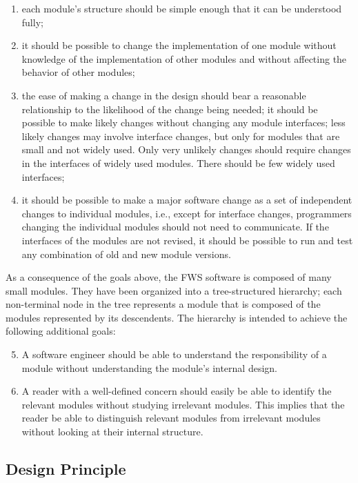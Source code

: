 \documentclass[letterpaper,11pt]{article}
\begin{document}
\begin{enumerate}
\item each module's structure should be simple enough that it can be understood fully;
\item it should be possible to change the implementation of one module without knowledge of the implementation of other modules and without affecting the behavior of other modules;
\item the ease of making a change in the design should bear a reasonable relationship to the likelihood of the change being needed; it should be possible to make likely changes without changing any module interfaces; less likely changes may involve interface changes, but only for modules that are small and not widely used. Only very unlikely changes should require changes in the interfaces of widely used modules. There should be few widely used interfaces;
\item it should be possible to make a major software change as a set of independent changes to individual modules, i.e., except for interface changes, programmers changing the individual modules should not need to communicate. If the interfaces of the modules are not revised, it should be possible to run and test any combination of old and new module versions.
\end{enumerate}

As a consequence of the goals above, the FWS software is composed of many small modules. They have been organized into a tree-structured hierarchy; each non-terminal node in the tree represents a module that is composed of the modules represented by its descendents. The hierarchy is intended to achieve the following additional goals:

\begin{enumerate}
\setcounter{enumi}{4}
\item A software engineer should be able to understand the responsibility of a module without understanding the module's internal design.
\item A reader with a well-defined concern should easily be able to identify the relevant modules without studying irrelevant modules. This implies that the reader be able to distinguish relevant modules from irrelevant modules without looking at their internal structure.
\end{enumerate}

\subsection{Design Principle}
\end{document}
